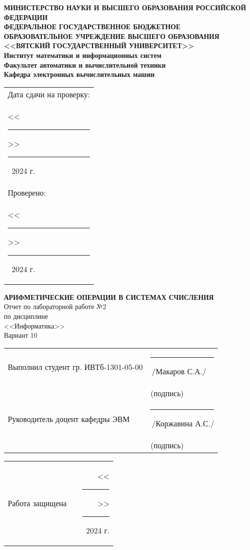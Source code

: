 \documentclass[a4paper,14pt]{extarticle}
\begin{document}
	
	\newpage\pagestyle{empty}
	\begin{center}
	\textbf{
		\MakeUppercase{
			Министерство науки и высшего образования Российской Федерации\\
			Федеральное государственное бюджетное образовательное учреждение высшего образования\\
			<<Вятский Государственный Университет>>\\
		}
		Институт математики и информационных систем\\
		Факультет автоматики и вычислительной техники\\
		Кафедра электронных вычислительных машин
	}
	\end{center}
	\vfill
	
	\hfill
	\begin{tabular}{l}
		\footnotesize Дата сдачи на проверку:\\
		\footnotesize <<\rule[-1mm]{5mm}{0.10mm}\/>>\rule[-1mm]{20mm}{0.10mm}\ 2024 г.\\
		\footnotesize Проверено:\\
		\footnotesize <<\rule[-1mm]{5mm}{0.10mm}\/>>\rule[-1mm]{20mm}{0.10mm}\ 2024 г.
	\end{tabular}
	\vfill
	
	\begin{center}
		\textbf{\MakeUppercase{Арифметические операции в системах счисления}}\\
		Отчет по лабораторной работе №2\\
		по дисциплине\\
		<<Информатика>>\\
		Вариант 10
	\end{center}
	\vfill
	
	\noindent
	\begin{tabular}{ll}
		Выполнил студент гр. ИВТб-1301-05-00 &
		\rule[-1mm]{30mm}{0.10mm}\,/Макаров С.А./\\
		& \hspace{8mm}\footnotesize(подпись)\\
		
		Руководитель доцент кафедры ЭВМ & \rule[-1mm]{30mm}{0.10mm}\,/Коржавина А.С./\\
		& \hspace{8mm}\footnotesize(подпись)\\
	\end{tabular}
	
	\noindent
	\begin{tabular}{lp{58mm}r}
		Работа защищена &  & <<\rule[-1mm]{5mm}{0.10mm}\/>>\rule[-1mm]{30mm}{0.10mm}\ 2024 г.
	\end{tabular}
	\vfill
	
\end{document}
